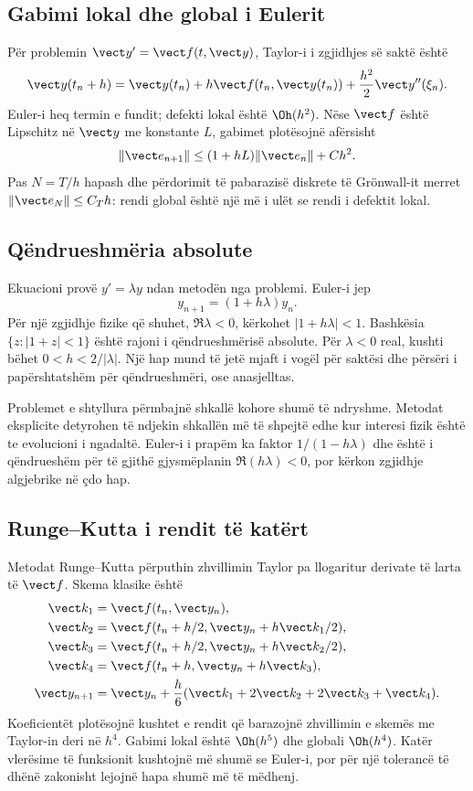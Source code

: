 \subsection{Gabimi lokal dhe global i Eulerit}
Për problemin $\vect y'=\vect f(t,\vect y)$, Taylor-i i zgjidhjes së saktë është
\begin{equation}
 \vect y(t_n+h)=\vect y(t_n)+h\vect f(t_n,\vect y(t_n))
 +\frac{h^2}{2}\vect y''(\xi_n).
\end{equation}
Euler-i heq termin e fundit; defekti lokal është $\Oh(h^2)$. Nëse $\vect f$ është Lipschitz në $\vect y$ me konstante $L$, gabimet plotësojnë afërsisht
\begin{equation}
 \|\vect e_{n+1}\|\le(1+hL)\|\vect e_n\|+Ch^2.
\end{equation}
Pas $N=T/h$ hapash dhe përdorimit të pabarazisë diskrete të Grönwall-it merret $\|\vect e_N\|\le C_T h$: rendi global është një më i ulët se rendi i defektit lokal.

\subsection{Qëndrueshmëria absolute}
Ekuacioni provë $y'=\lambda y$ ndan metodën nga problemi. Euler-i jep
\begin{equation}
 y_{n+1}=(1+h\lambda)y_n.
\end{equation}
Për një zgjidhje fizike që shuhet, $\Re\lambda<0$, kërkohet $|1+h\lambda|<1$. Bashkësia $\{z:|1+z|<1\}$ është rajoni i qëndrueshmërisë absolute. Për $\lambda<0$ real, kushti bëhet $0<h<2/|\lambda|$. Një hap mund të jetë mjaft i vogël për saktësi dhe përsëri i papërshtatshëm për qëndrueshmëri, ose anasjelltas.

Problemet e shtyllura përmbajnë shkallë kohore shumë të ndryshme. Metodat eksplicite detyrohen të ndjekin shkallën më të shpejtë edhe kur interesi fizik është te evolucioni i ngadaltë. Euler-i i prapëm ka faktor $1/(1-h\lambda)$ dhe është i qëndrueshëm për të gjithë gjysmëplanin $\Re(h\lambda)<0$, por kërkon zgjidhje algjebrike në çdo hap.

\subsection{Runge--Kutta i rendit të katërt}
Metodat Runge--Kutta përputhin zhvillimin Taylor pa llogaritur derivate të larta të $\vect f$. Skema klasike është
\begin{align}
 \vect k_1&=\vect f(t_n,\vect y_n),\\
 \vect k_2&=\vect f(t_n+h/2,\vect y_n+h\vect k_1/2),\\
 \vect k_3&=\vect f(t_n+h/2,\vect y_n+h\vect k_2/2),\\
 \vect k_4&=\vect f(t_n+h,\vect y_n+h\vect k_3),\\
 \vect y_{n+1}&=\vect y_n+\frac{h}{6}(\vect k_1+2\vect k_2+2\vect k_3+\vect k_4).
\end{align}
Koeficientët plotësojnë kushtet e rendit që barazojnë zhvillimin e skemës me Taylor-in deri në $h^4$. Gabimi lokal është $\Oh(h^5)$ dhe globali $\Oh(h^4)$. Katër vlerësime të funksionit kushtojnë më shumë se Euler-i, por për një tolerancë të dhënë zakonisht lejojnë hapa shumë më të mëdhenj.

